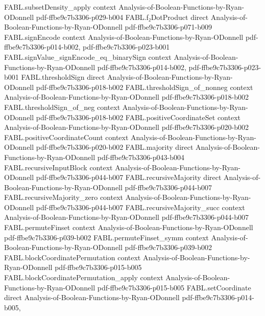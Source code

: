 \begin{theorem}
\proofstep
  {FABL.subsetDensity_apply}
  {context}
  {Analysis-of-Boolean-Functions-by-Ryan-ODonnell}
  {pdf-ffbe9c7b3306-p029-b004}
\proofstep
  {FABL.f₂DotProduct}
  {direct}
  {Analysis-of-Boolean-Functions-by-Ryan-ODonnell}
  {pdf-ffbe9c7b3306-p071-b009}
\proofstep
  {FABL.signEncode}
  {context}
  {Analysis-of-Boolean-Functions-by-Ryan-ODonnell}
  {pdf-ffbe9c7b3306-p014-b002,
    pdf-ffbe9c7b3306-p023-b001}
\proofstep
  {FABL.signValue_signEncode_eq_binarySign}
  {context}
  {Analysis-of-Boolean-Functions-by-Ryan-ODonnell}
  {pdf-ffbe9c7b3306-p014-b002,
    pdf-ffbe9c7b3306-p023-b001}
\proofstep
  {FABL.thresholdSign}
  {direct}
  {Analysis-of-Boolean-Functions-by-Ryan-ODonnell}
  {pdf-ffbe9c7b3306-p018-b002}
\proofstep
  {FABL.thresholdSign_of_nonneg}
  {context}
  {Analysis-of-Boolean-Functions-by-Ryan-ODonnell}
  {pdf-ffbe9c7b3306-p018-b002}
\proofstep
  {FABL.thresholdSign_of_neg}
  {context}
  {Analysis-of-Boolean-Functions-by-Ryan-ODonnell}
  {pdf-ffbe9c7b3306-p018-b002}
\proofstep
  {FABL.positiveCoordinateSet}
  {context}
  {Analysis-of-Boolean-Functions-by-Ryan-ODonnell}
  {pdf-ffbe9c7b3306-p020-b002}
\proofstep
  {FABL.positiveCoordinateCount}
  {context}
  {Analysis-of-Boolean-Functions-by-Ryan-ODonnell}
  {pdf-ffbe9c7b3306-p020-b002}
\proofstep
  {FABL.majority}
  {direct}
  {Analysis-of-Boolean-Functions-by-Ryan-ODonnell}
  {pdf-ffbe9c7b3306-p043-b004}
\proofstep
  {FABL.recursiveInputBlock}
  {context}
  {Analysis-of-Boolean-Functions-by-Ryan-ODonnell}
  {pdf-ffbe9c7b3306-p044-b007}
\proofstep
  {FABL.recursiveMajority}
  {direct}
  {Analysis-of-Boolean-Functions-by-Ryan-ODonnell}
  {pdf-ffbe9c7b3306-p044-b007}
\proofstep
  {FABL.recursiveMajority_zero}
  {context}
  {Analysis-of-Boolean-Functions-by-Ryan-ODonnell}
  {pdf-ffbe9c7b3306-p044-b007}
\proofstep
  {FABL.recursiveMajority_succ}
  {context}
  {Analysis-of-Boolean-Functions-by-Ryan-ODonnell}
  {pdf-ffbe9c7b3306-p044-b007}
\proofstep
  {FABL.permuteFinset}
  {context}
  {Analysis-of-Boolean-Functions-by-Ryan-ODonnell}
  {pdf-ffbe9c7b3306-p039-b002}
\proofstep
  {FABL.permuteFinset_symm}
  {context}
  {Analysis-of-Boolean-Functions-by-Ryan-ODonnell}
  {pdf-ffbe9c7b3306-p039-b002}
\proofstep
  {FABL.blockCoordinatePermutation}
  {context}
  {Analysis-of-Boolean-Functions-by-Ryan-ODonnell}
  {pdf-ffbe9c7b3306-p015-b005}
\proofstep
  {FABL.blockCoordinatePermutation_apply}
  {context}
  {Analysis-of-Boolean-Functions-by-Ryan-ODonnell}
  {pdf-ffbe9c7b3306-p015-b005}
\proofstep
  {FABL.setCoordinate}
  {direct}
  {Analysis-of-Boolean-Functions-by-Ryan-ODonnell}
  {pdf-ffbe9c7b3306-p014-b005,
}
\end{theorem}
